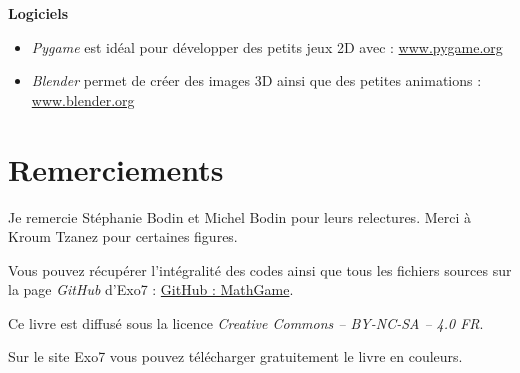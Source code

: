 \smallskip

\textbf{Logiciels}


\begin{itemize}
	\item \emph{Pygame} est idéal pour développer des petits jeux 2D avec \Python{} : \href{https://www.pygame.org/}{www.pygame.org}	
	\item \emph{Blender} permet de créer des images 3D ainsi que des petites animations : \href{https://www.blender.org/}{www.blender.org}
\end{itemize}



\section*{Remerciements}

Je remercie Stéphanie Bodin et Michel Bodin pour leurs relectures. Merci à Kroum Tzanez pour certaines figures.


\medskip

\begin{center}
Vous pouvez récupérer l'intégralité des codes \Python{} ainsi que tous les fichiers sources sur la page \emph{GitHub} d'Exo7 :
\href{https://github.com/exo7math/mathgame-exo7}{\og{}GitHub : MathGame\fg{}}.


\end{center}


\vspace*{\fill}


\begin{center}
\end{center}



\begin{center}
Ce livre est diffusé sous la licence \emph{Creative Commons -- BY-NC-SA -- 4.0 FR}.

Sur le site Exo7 vous pouvez télécharger gratuitement le livre en couleurs.
\end{center}




\printindex
{}

